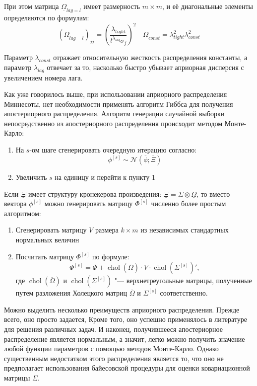 \documentclass[11pt]{article} %
\DeclareMathOperator{\chol}{chol}
\newcommand{\cN}{\mathcal{N}}
\newcommand{\prior}{\underline}
\newcommand{\post}{\overline}
\begin{document}
При этом матрица $\prior \Omega_{lag=l}$ имеет размерность $m\times m$, и её диагональные элементы определяются по формулам:
\begin{equation}
(\prior \Omega_{lag=l})_{jj} \label{prior_omega2}
=\left(\frac{\lambda_{tight}}{l^{\lambda_{lag}}\sigma_j}\right)^2
\quad
\prior \Omega_{const}=\lambda_{tight}^2\lambda_{const}^2
\end{equation}

Параметр $\lambda_{const}$ отражает относительную жесткость распределения константы, а параметр $\lambda_{lag}$ отвечает за то, насколько быстро убывает априорная дисперсия с увеличением номера лага.

Как уже говорилось выше, при использовании априорного распределения Миннесоты, нет необходимости применять алгоритм Гиббса для получения апостериорного распределения. Алгоритм генерации случайной выборки непосредственно из апостериорного распределения происходит методом Монте-Карло: \label{alg:alg1}
\begin{enumerate}
\item На $s$-ом шаге сгенерировать очередную итерацию согласно:
\begin{equation}
\phi^{[s]}\sim \cN(\post \phi; \post \Xi)
\end{equation}
\item Увеличить $s$ на единицу и перейти к пункту 1
\end{enumerate}

Если $\prior \Xi$ имеет структуру кронекерова произведения: $\prior \Xi = \Sigma \otimes \prior \Omega$, то вместо вектора $\phi^{[s]}$ можно генерировать матрицу $\Phi^{[s]}$ численно более простым алгоритмом:


\begin{enumerate}
\item Сгенерировать матрицу $V$ размера $k\times m$  из независимых стандартных нормальных величин
\item Посчитать матрицу $\Phi^{[s]}$ по формуле:
\begin{equation}
\Phi^{[s]} = \post \Phi + \chol(\post\Omega) \cdot V \cdot \chol(\Sigma^{[s]})',
\end{equation}
где $\chol(\post\Omega)$ и  $\chol(\Sigma^{[s]})$ "--- верхнетреугольные матрицы, полученные путем разложения Холецкого матриц $\post\Omega$ и $\Sigma^{[s]}$ соответственно.
\end{enumerate}

Можно выделить несколько преимуществ априорного распределения. Прежде всего, оно просто задается, Кроме того, оно успешно применялось в литературе для решения различных задач. И наконец, получившееся апостериорное распределение является нормальным, а значит, легко можно получить значение любой функции параметров с помощью методов Монте-Карло. Однако существенным недостатком этого распределения является то, что оно не предполагает использования байесовской процедуры для оценки ковариационной матрицы $\Sigma$.
\end{document}
